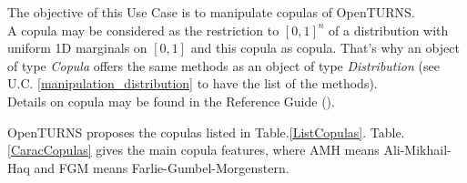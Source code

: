 \renewcommand{\filename}{docUC_InputNoData_Copula}
\renewcommand{\filetitle}{UC : List of Copula}

\HeaderIIILevel








The objective of this Use Case is to manipulate copulas of OpenTURNS.\\

A copula may be considered as the restriction to $[0,1]^n$ of a distribution with uniform 1D marginals on $[0,1]$ and this copula as copula. That's why an object of type {\itshape Copula} offers the same methods as an object of type {\itshape Distribution} (see U.C. \ref{manipulation_distribution} to have the list of the methods).\\

Details on copula may be found in the Reference Guide ().\\





OpenTURNS proposes the copulas listed in Table.\ref{ListCopulas}.  Table.\ref{CaracCopulas} gives the main copula features, where AMH means Ali-Mikhail-Haq and FGM means Farlie-Gumbel-Morgenstern.

